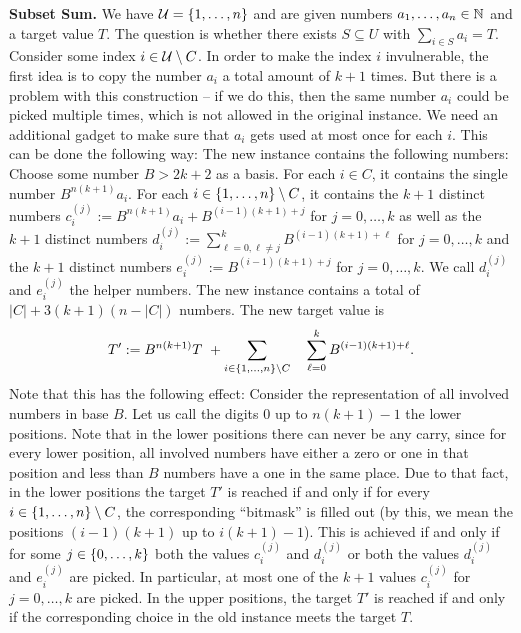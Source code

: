 \textbf{Subset Sum.}
We have $\mathcal{U} = \{ 1, \ldots, n \}$ and are given numbers $a_1, \dots, a_n \in \mathbb{N}$ and a target value $T$. The question is whether there exists $S \subseteq U$ with $\sum_{i \in S} a_i = T$. 
Consider some index $i \in \mathcal{U} \setminus C$. In order to make the index $i$ invulnerable, the first idea is to copy the number $a_i$ a total amount of $k+1$ times. 
But there is a problem with this construction -- if we do this, then the same number $a_i$ could be picked multiple times, which is not allowed in the original instance.
We need an additional gadget to make sure that $a_i$ gets used at most once for each $i$. This can be done the following way: 
The new instance contains the following numbers: Choose some number $B > 2k+2$ as a basis. 
For each $i \in C$, it contains the single number $B^{n(k+1)}a_i$. 
For each $i \in \{ 1, \ldots, n \} \setminus C$, it contains the $k+1$ distinct numbers  $c_i^{(j)} := B^{n(k+1)}a_i + B^{(i-1)(k+1) + j}$ for $j = 0,\dots, k$ as well as the $k+1$ distinct numbers $d_i^{(j)} := \sum_{\ell = 0,\ell \neq j}^k B^{(i-1)(k+1) + \ell}$ for $j = 0,\dots, k$ and the $k+1$ distinct numbers $e_i^{(j)} := B^{(i-1)(k+1) + j}$ for $j = 0,\dots, k$. We call $d_i^{(j)}$ and $e_i^{(j)}$ the helper numbers.
The new instance contains a total of $|C| + 3(k+1)(n - |C|)$ numbers. The new target value is 
$$
T' := B^{n(k+1)}T \ + \sum_{i \in \{ 1, \ldots, n \} \setminus C} \quad \sum_{\ell = 0}^k B^{(i-1)(k+1) + \ell}.
$$
Note that this has the following effect: 
Consider the representation of all involved numbers in base $B$. Let us call the digits $0$ up to $n(k+1) - 1$ the lower positions. 
Note that in the lower positions there can never be any carry, since for every lower position, all involved numbers have either a zero or one in that position and less than $B$ numbers have a one in the same place.
Due to that fact, in the lower positions the target $T'$ is reached if and only if for every $i \in \{ 1, \ldots, n \} \setminus C$, the corresponding \enquote{bitmask} is filled out (by this, we mean the positions $(i-1)(k+1)$ up to $i(k+1) - 1$).
This is achieved if and only if for some $j \in \{ 0, \ldots, k \}$ both the values $c^{(j)}_i$ and $d^{(j)}_i$ or both the values $d^{(j)}_i$ and $e^{(j)}_i$ are picked. In particular, at most one of the $k+1$ values $c^{(j)}_i$ for $j=0,\dots,k$ are picked.
In the upper positions, the target $T'$ is reached if and only if the corresponding choice in the old instance meets the target $T$.

